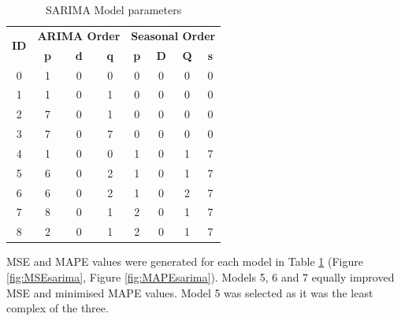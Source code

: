 \documentclass[mstat,12pt]{unswthesis}
\begin{document}
\begin{table}[H]
\centering
\caption{SARIMA Model parameters}
\begin{tabular}{|c|ccc|cccc|}
\hline
\multirow{2}{*}{\textbf{ID}} & \multicolumn{3}{c|}{\textbf{ARIMA Order}} & \multicolumn{4}{c|}{\textbf{Seasonal Order}} \\ \cline{2-8} 
 & \multicolumn{1}{c|}{\textbf{p}} & \multicolumn{1}{c|}{\textbf{d}} & \textbf{q} & \multicolumn{1}{c|}{\textbf{p}} & \multicolumn{1}{c|}{\textbf{D}} & \multicolumn{1}{c|}{\textbf{Q}} & \textbf{s} \\ \hline
0 & \multicolumn{1}{c|}{1} & \multicolumn{1}{c|}{0} & 0 & \multicolumn{1}{c|}{0} & \multicolumn{1}{c|}{0} & \multicolumn{1}{c|}{0} & 0 \\ \hline
1 & \multicolumn{1}{c|}{1} & \multicolumn{1}{c|}{0} & 1 & \multicolumn{1}{c|}{0} & \multicolumn{1}{c|}{0} & \multicolumn{1}{c|}{0} & 0 \\ \hline
2 & \multicolumn{1}{c|}{7} & \multicolumn{1}{c|}{0} & 1 & \multicolumn{1}{c|}{0} & \multicolumn{1}{c|}{0} & \multicolumn{1}{c|}{0} & 0 \\ \hline
3 & \multicolumn{1}{c|}{7} & \multicolumn{1}{c|}{0} & 7 & \multicolumn{1}{c|}{0} & \multicolumn{1}{c|}{0} & \multicolumn{1}{c|}{0} & 0 \\ \hline
4 & \multicolumn{1}{c|}{1} & \multicolumn{1}{c|}{0} & 0 & \multicolumn{1}{c|}{1} & \multicolumn{1}{c|}{0} & \multicolumn{1}{c|}{1} & 7 \\ \hline
5 & \multicolumn{1}{c|}{6} & \multicolumn{1}{c|}{0} & 2 & \multicolumn{1}{c|}{1} & \multicolumn{1}{c|}{0} & \multicolumn{1}{c|}{1} & 7 \\ \hline
6 & \multicolumn{1}{c|}{6} & \multicolumn{1}{c|}{0} & 2 & \multicolumn{1}{c|}{1} & \multicolumn{1}{c|}{0} & \multicolumn{1}{c|}{2} & 7 \\ \hline
7 & \multicolumn{1}{c|}{8} & \multicolumn{1}{c|}{0} & 1 & \multicolumn{1}{c|}{2} & \multicolumn{1}{c|}{0} & \multicolumn{1}{c|}{1} & 7 \\ \hline
8 & \multicolumn{1}{c|}{2} & \multicolumn{1}{c|}{0} & 1 & \multicolumn{1}{c|}{2} & \multicolumn{1}{c|}{0} & \multicolumn{1}{c|}{1} & 7 \\ \hline
\end{tabular}
\label{tab:tab7}
\end{table}

\bigskip

MSE and MAPE values were generated for each model in Table \ref{tab:tab7} (Figure \ref{fig:MSEsarima}, Figure \ref{fig:MAPEsarima}). Models 5, 6 and 7 equally improved MSE and minimised MAPE values. Model 5 was selected as it was the least complex of the three.
\end{document}

